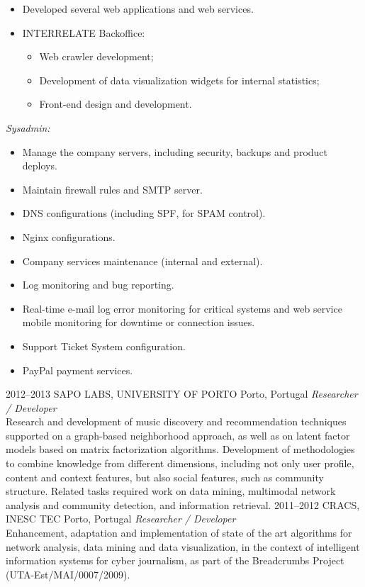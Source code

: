 \documentclass{friggeri-cv}
\begin{document}
\begin{entrylist}
{{\begin{itemize}
  \item Developed several web applications and web services.
  \item INTERRELATE Backoffice:
    \begin{itemize}
      \item Web crawler development;
      \item Development of data visualization widgets for internal statistics;
      \item Front-end design and development.
    \end{itemize}
\end{itemize}}
\vspace{0.3em}
{\normalsize \emph{Sysadmin:}}
\vspace{0.175em}
{\footnotesize \begin{itemize}
  \setlength\itemsep{.0175em}
  \item Manage the company servers, including security, backups and product deploys.
  \item Maintain firewall rules and SMTP server.
  \item DNS configurations (including SPF, for SPAM control).
  \item Nginx configurations.
  \item Company services maintenance (internal and external).
  \item Log monitoring and bug reporting.
  \item Real-time e-mail log error monitoring for critical systems and web service mobile monitoring for downtime or connection issues.
  \item Support Ticket System configuration.
  \item PayPal payment services.
\end{itemize}}}
\entry
{2012--2013}
{SAPO LABS, UNIVERSITY OF PORTO}
{Porto, Portugal}
{\emph{Researcher / Developer}\\
Research and development of music discovery and recommendation techniques supported on a graph-based neighborhood approach, as well as on latent factor models based on matrix factorization algorithms. Development of methodologies to combine knowledge from different dimensions, including not only user profile, content and context features, but also social features, such as community structure. Related tasks required work on data mining, multimodal network analysis and community detection, and information retrieval.}
\entry
{2011--2012}
{CRACS, INESC TEC}
{Porto, Portugal}
{\emph{Researcher / Developer}\\
Enhancement, adaptation and implementation of state of the art algorithms for network analysis, data mining and data visualization, in the context of intelligent information systems for cyber journalism, as part of the Breadcrumbs Project (UTA-Est/MAI/0007/2009).}
\end{entrylist}
\end{document}
